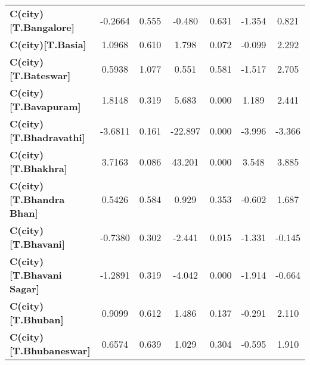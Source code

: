 \begin{center}
\begin{tabular}{lcccccc}
\textbf{C(city)[T.Bangalore]}                                                                       &      -0.2664  &        0.555     &    -0.480  &         0.631        &       -1.354    &        0.821     \\
\textbf{C(city)[T.Basia]}                                                                           &       1.0968  &        0.610     &     1.798  &         0.072        &       -0.099    &        2.292     \\
\textbf{C(city)[T.Bateswar]}                                                                        &       0.5938  &        1.077     &     0.551  &         0.581        &       -1.517    &        2.705     \\
\textbf{C(city)[T.Bavapuram]}                                                                       &       1.8148  &        0.319     &     5.683  &         0.000        &        1.189    &        2.441     \\
\textbf{C(city)[T.Bhadravathi]}                                                                     &      -3.6811  &        0.161     &   -22.897  &         0.000        &       -3.996    &       -3.366     \\
\textbf{C(city)[T.Bhakhra]}                                                                         &       3.7163  &        0.086     &    43.201  &         0.000        &        3.548    &        3.885     \\
\textbf{C(city)[T.Bhandra Bhan]}                                                                    &       0.5426  &        0.584     &     0.929  &         0.353        &       -0.602    &        1.687     \\
\textbf{C(city)[T.Bhavani]}                                                                         &      -0.7380  &        0.302     &    -2.441  &         0.015        &       -1.331    &       -0.145     \\
\textbf{C(city)[T.Bhavani Sagar]}                                                                   &      -1.2891  &        0.319     &    -4.042  &         0.000        &       -1.914    &       -0.664     \\
\textbf{C(city)[T.Bhuban]}                                                                          &       0.9099  &        0.612     &     1.486  &         0.137        &       -0.291    &        2.110     \\
\textbf{C(city)[T.Bhubaneswar]}                                                                     &       0.6574  &        0.639     &     1.029  &         0.304        &       -0.595    &        1.910     \\

\end{tabular}
\end{center}
